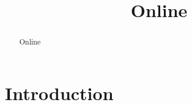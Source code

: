 \documentclass{article}
\title{Online}
\begin{document}
\maketitle
\begin{abstract}
   Online 
\end{abstract}

\section{Introduction}




\end{document}

